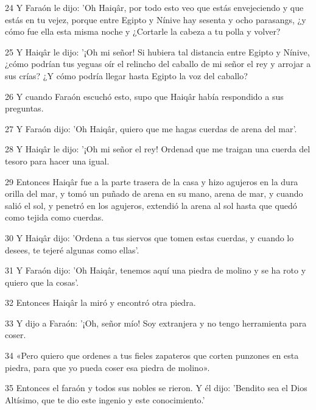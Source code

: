 \par 24 Y Faraón le dijo: 'Oh Haiqâr, por todo esto veo que estás envejeciendo y que estás en tu vejez, porque entre Egipto y Nínive hay sesenta y ocho parasangs, ¿y cómo fue ella esta misma noche y ¿Cortarle la cabeza a tu polla y volver?

\par 25 Y Haiqâr le dijo: '¡Oh mi señor! Si hubiera tal distancia entre Egipto y Nínive, ¿cómo podrían tus yeguas oír el relincho del caballo de mi señor el rey y arrojar a sus crías? ¿Y cómo podría llegar hasta Egipto la voz del caballo?

\par 26 Y cuando Faraón escuchó esto, supo que Haiqâr había respondido a sus preguntas.

\par 27 Y Faraón dijo: 'Oh Haiqâr, quiero que me hagas cuerdas de arena del mar'.

\par 28 Y Haiqâr le dijo: '¡Oh mi señor el rey! Ordenad que me traigan una cuerda del tesoro para hacer una igual.

\par 29 Entonces Haiqâr fue a la parte trasera de la casa y hizo agujeros en la dura orilla del mar, y tomó un puñado de arena en su mano, arena de mar, y cuando salió el sol, y penetró en los agujeros, extendió la arena al sol hasta que quedó como tejida como cuerdas.

\par 30 Y Haiqâr dijo: 'Ordena a tus siervos que tomen estas cuerdas, y cuando lo desees, te tejeré algunas como ellas'.

\par 31 Y Faraón dijo: 'Oh Haiqâr, tenemos aquí una piedra de molino y se ha roto y quiero que la cosas'.

\par 32 Entonces Haiqâr la miró y encontró otra piedra.

\par 33 Y dijo a Faraón: '¡Oh, señor mío! Soy extranjera y no tengo herramienta para coser.

\par 34 «Pero quiero que ordenes a tus fieles zapateros que corten punzones en esta piedra, para que yo pueda coser esa piedra de molino».

\par 35 Entonces el faraón y todos sus nobles se rieron. Y él dijo: 'Bendito sea el Dios Altísimo, que te dio este ingenio y este conocimiento.'

